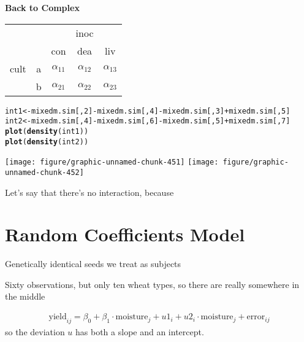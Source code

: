 \documentclass[12pt,letterpaper,oneside]{article}\usepackage{graphicx, color}
\makeatletter
\newcommand{\hlfunctioncall}[1]{\textcolor[rgb]{0.501960784313725,0,0.329411764705882}{\textbf{#1}}}%
\newenvironment{kframe}{%
 \def\at@end@of@kframe{}%
 \ifinner\ifhmode%
  \def\at@end@of@kframe{\end{minipage}}%
  \begin{minipage}{\columnwidth}%
 \fi\fi%
 \def\FrameCommand##1{\hskip\@totalleftmargin \hskip-\fboxsep
 \colorbox{shadecolor}{##1}\hskip-\fboxsep
     \hskip-\linewidth \hskip-\@totalleftmargin \hskip\columnwidth}%
 \MakeFramed {\advance\hsize-\width
   \@totalleftmargin\z@ \linewidth\hsize
   \@setminipage}}%
 {\par\unskip\endMakeFramed%
 \at@end@of@kframe}
\newenvironment{knitrout}{}{} %
\newcommand{\dateTaken}{January 7, 2013}
\makeatother
\begin{document}
\textbf{Back to Complex}
\begin{tabular}{ccccc}
 &  &  & inoc & \\
 &  & con & dea & liv \\
 cult & a & $\alpha_{1 1}$ & $\alpha_{1 2}$ & $\alpha_{1 3}$\\
 & b & $\alpha_{2 1}$ & $\alpha_{2 2}$ & $\alpha_{2 3}$\\
\end{tabular}
\begin{knitrout}\scriptsize
{}\color{fgcolor}\begin{kframe}
\begin{alltt}
int1 <- mixedm.sim[, 2] - mixedm.sim[, 4] - mixedm.sim[, 3] + mixedm.sim[, 5]
int2 <- mixedm.sim[, 4] - mixedm.sim[, 6] - mixedm.sim[, 5] + mixedm.sim[, 7]
\hlfunctioncall{plot}(\hlfunctioncall{density}(int1))
\hlfunctioncall{plot}(\hlfunctioncall{density}(int2))
\end{alltt}
\end{kframe}

{\centering \texttt{[image: figure/graphic-unnamed-chunk-451]} 
\texttt{[image: figure/graphic-unnamed-chunk-452]} 

}



\end{knitrout}

Let's say that there's no interaction, because

\renewcommand{\dateTaken}{March  5, 2013}
\daysep

\section{Random Coefficients Model} %
\label{sec:random_coefficients_model}
Genetically identical seeds we treat as subjects

Sixty observations, but only ten wheat types, so there are really somewhere in the middle

\begin{align*}
    \text{yield}_{i j} = \beta_{0} + \beta_{1}\cdot \text{moisture}_{j} + u1_{i} + u2_{i} \cdot \text{moisture}_{j} + \text{error}_{ij}
\end{align*}
so the deviation $u$ has both a slope and an intercept.
\end{document}
